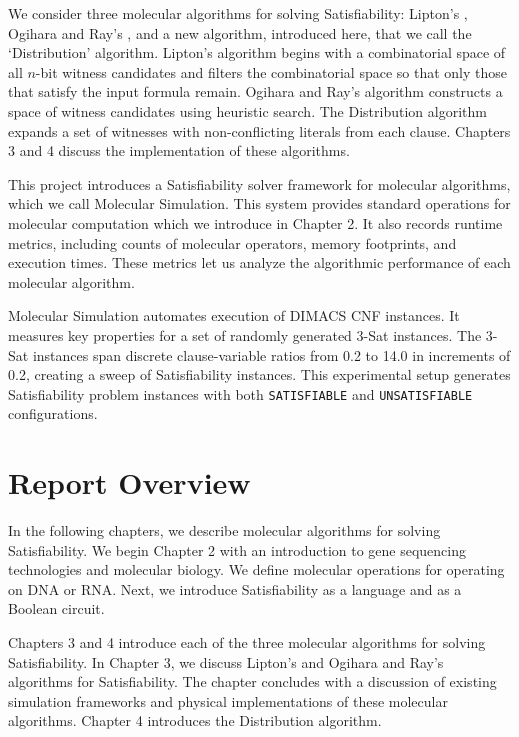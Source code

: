 We consider three molecular algorithms for solving {\sc Satisfiability}: Lipton's \cite{Lipton95usingdna}, Ogihara and Ray's \cite{Ogihara:1996:BFS:898228, Ogihara97dna-basedparallel}, and a new algorithm, introduced here, that we call the `Distribution' algorithm.  Lipton's algorithm begins with a combinatorial space of all $n$-bit witness candidates and filters the combinatorial space so that only those that satisfy the input formula remain.  Ogihara and Ray's algorithm constructs a space of witness candidates using heuristic search.  The Distribution algorithm expands a set of witnesses with non-conflicting literals from each clause.  Chapters 3 and 4 discuss the implementation of these algorithms.

This project introduces a {\sc Satisfiability} solver framework for molecular algorithms, which we call Molecular Simulation.  This system provides standard operations for molecular computation which we introduce in Chapter 2.  It also records runtime metrics, including counts of molecular operators, memory footprints, and execution times.  These metrics let us analyze the algorithmic performance of each molecular algorithm.

Molecular Simulation automates execution of DIMACS CNF instances.  It measures key properties for a set of randomly generated $3$-{\sc Sat} instances.  The $3$-{\sc Sat} instances span discrete clause-variable ratios from 0.2 to 14.0 in increments of 0.2, creating a sweep of {\sc Satisfiability} instances.  This experimental setup generates {\sc Satisfiability} problem instances with both \texttt{SATISFIABLE} and \texttt{UNSATISFIABLE} configurations.

\section{Report Overview}

In the following chapters, we describe molecular algorithms for solving {\sc Satisfiability}.  We begin Chapter 2 with an introduction to gene sequencing technologies and molecular biology.  We define molecular operations for operating on DNA or RNA.  Next, we introduce {\sc Satisfiability} as a language and as a Boolean circuit.

Chapters 3 and 4 introduce each of the three molecular algorithms for solving {\sc Satisfiability}.  In Chapter 3, we discuss Lipton's \cite{Lipton95usingdna, dnaComputingModels2008} and Ogihara and Ray's \cite{Ogihara:1996:BFS:898228, Ogihara97dna-basedparallel, dnaBasedImplemetation_Yoshida2000} algorithms for {\sc Satisfiability}.  The chapter concludes with a discussion of existing simulation frameworks and physical implementations of these molecular algorithms.  Chapter 4 introduces the Distribution algorithm.

